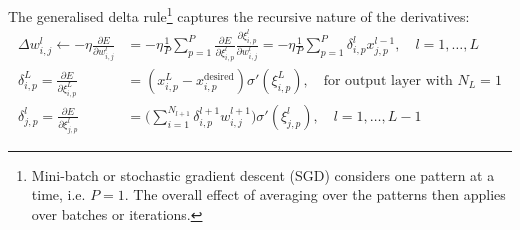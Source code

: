 The generalised delta rule\footnote{
Mini-batch or stochastic gradient descent (SGD) considers one pattern at a time, i.e. $P = 1$.
The overall effect of averaging over the patterns then applies over batches or iterations.
} captures the recursive nature of the derivatives:
\begin{equation}
\begin{split}
    \Delta w_{i, j}^l \leftarrow - \eta \frac{\partial E}{\partial w_{i, j}^l}
    & = - \eta \frac{1}{P} \sum_{p=1}^P{ \frac{\partial E}{\partial \xi_{i,p}^l} \frac{\partial \xi_{i,p}^l}{\partial w_{i,j}^l} }
    = - \eta \frac{1}{P} \sum_{p=1}^P{ \delta_{i, p}^l x_{j, p}^{l-1} }, \quad l = 1, \dots, L \\
    \delta_{i, p}^L = \frac{\partial E}{\partial \xi_{i, p}^L}
    & = ( x_{i, p}^L - x_{i, p}^\text{desired} ) \sigma'( \xi_{i, p}^L ), \quad \text{for output layer with } N_L = 1 \\
    \delta_{j, p}^l = \frac{\partial E}{\partial \xi_{j, p}^l}
    & = \Big( \sum_{i=1}^{N_{l+1}}{ \delta_{i, p}^{l+1} w_{i, j}^{l+1} } \Big) \sigma'( \xi_{j, p}^l ), \quad l = 1, \dots, L-1
\end{split}
\end{equation}

